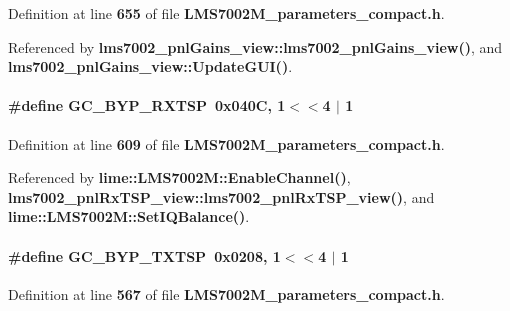Definition at line {\bf 655} of file {\bf L\+M\+S7002\+M\+\_\+parameters\+\_\+compact.\+h}.



Referenced by {\bf lms7002\+\_\+pnl\+Gains\+\_\+view\+::lms7002\+\_\+pnl\+Gains\+\_\+view()}, and {\bf lms7002\+\_\+pnl\+Gains\+\_\+view\+::\+Update\+G\+U\+I()}.

\paragraph[{G\+C\+\_\+\+B\+Y\+P\+\_\+\+R\+X\+T\+SP}]{\setlength{\rightskip}{0pt plus 5cm}\#define G\+C\+\_\+\+B\+Y\+P\+\_\+\+R\+X\+T\+SP~0x040\+C, 1$<$$<$4 $\vert$  1}\label{LMS7002M__parameters__compact_8h_ab2816e6ef6230088733b840fca6cf512}


Definition at line {\bf 609} of file {\bf L\+M\+S7002\+M\+\_\+parameters\+\_\+compact.\+h}.



Referenced by {\bf lime\+::\+L\+M\+S7002\+M\+::\+Enable\+Channel()}, {\bf lms7002\+\_\+pnl\+Rx\+T\+S\+P\+\_\+view\+::lms7002\+\_\+pnl\+Rx\+T\+S\+P\+\_\+view()}, and {\bf lime\+::\+L\+M\+S7002\+M\+::\+Set\+I\+Q\+Balance()}.

\paragraph[{G\+C\+\_\+\+B\+Y\+P\+\_\+\+T\+X\+T\+SP}]{\setlength{\rightskip}{0pt plus 5cm}\#define G\+C\+\_\+\+B\+Y\+P\+\_\+\+T\+X\+T\+SP~0x0208, 1$<$$<$4 $\vert$  1}\label{LMS7002M__parameters__compact_8h_ac0bb163a702030f0149faa18d0eb7bdb}


Definition at line {\bf 567} of file {\bf L\+M\+S7002\+M\+\_\+parameters\+\_\+compact.\+h}.



